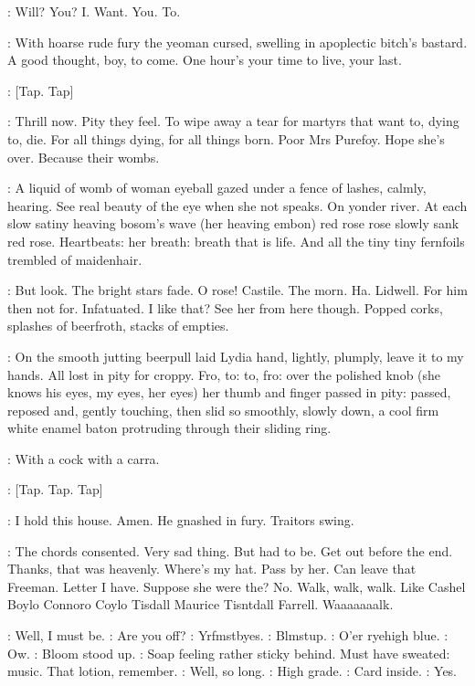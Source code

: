 \BloomInt:
Will?
You?
I.
Want.
You.
To.

:
With hoarse rude fury the yeoman cursed,
swelling in apoplectic
bitch's bastard.
A good thought,
boy,
to come.
One hour's your time to
live,
your last.

\stripling:
[Tap.
Tap]

\BloomInt:
Thrill now.
Pity they feel.
To wipe away a tear for martyrs that want
to,
dying to,
die.
For all things dying,
for all things born.
Poor Mrs
Purefoy.
Hope she's over.
Because their wombs.

\BloomInt:
A liquid of womb of woman eyeball gazed under a fence of lashes,
calmly,
hearing.
See real beauty of the eye when she not speaks.
On yonder
river.
At each slow satiny heaving bosom's wave (her heaving embon) red
rose rose slowly sank red rose.
Heartbeats:
her breath:
breath that is
life.
And all the tiny tiny fernfoils trembled of maidenhair.

\BloomInt:
But look.
The bright stars fade.
O rose!
Castile.
The morn.
Ha.
Lidwell.
For him then not for.
Infatuated.
I like that?
See her
from here though.
Popped corks,
splashes of beerfroth,
stacks of empties.

:
On the smooth jutting beerpull laid Lydia hand,
lightly,
plumply,
leave
it to my hands.
All lost in pity for croppy.
Fro,
to:
to,
fro:
over the
polished knob (she knows his eyes,
my eyes,
her eyes) her thumb and finger
passed in pity:
passed,
reposed and,
gently touching,
then slid so
smoothly,
slowly down,
a cool firm white enamel baton protruding through
their sliding ring.

\BloomInt:
With a cock with a carra.

\stripling:
[Tap.
Tap.
Tap]

\BloomInt:
I hold this house.
Amen.
He gnashed in fury.
Traitors swing.

\BloomInt:
The chords consented.
Very sad thing.
But had to be.
Get out before
the end.
Thanks,
that was heavenly.
Where's my hat.
Pass by her.
Can
leave that Freeman.
Letter I have.
Suppose she were the?
No.
Walk,
walk,
walk.
Like Cashel Boylo Connoro Coylo Tisdall Maurice Tisntdall
Farrell.
Waaaaaaalk.

\BloomInt:
Well,
I must be.
\goulding:
Are you off?
\BloomInt:
Yrfmstbyes.
\BloomInt:
Blmstup.
\goulding:
O'er ryehigh blue.
\BloomInt:
Ow.
:
Bloom stood up.
\BloomInt:
Soap feeling rather sticky behind.
Must have
sweated:
music.
That lotion,
remember.
\BloomInt:
Well,
so long.
\goulding:
High grade.
\BloomInt:
Card inside.
\goulding:
Yes.

